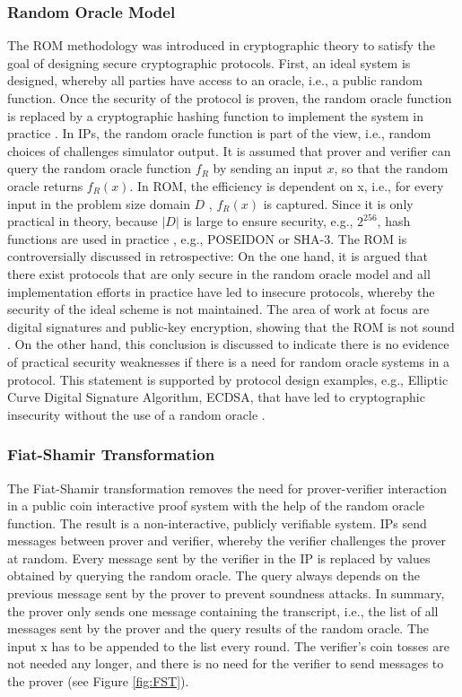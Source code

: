 \subsubsection{Random Oracle Model}
The ROM methodology was introduced in cryptographic theory to satisfy the goal of designing secure cryptographic protocols. First, an ideal system is designed, whereby all parties have access to an oracle, i.e., a public random function. Once the security of the protocol is proven, the random oracle function is replaced by a cryptographic hashing function to implement the system in practice \citep{ROMBellare}. In IPs, the random oracle function is part of the view, i.e., random choices of challenges simulator output. It is assumed that prover and verifier can query the random oracle function \(f_R\) by sending an input \(x\), so that the random oracle returns \(f_R(x)\). In ROM, the efficiency is dependent on x, i.e., for every input in the problem size domain \(D\) , \(f_R(x)\) is captured. Since it is only practical in theory, because \(|D|\) is large to ensure security, e.g., \(2^{256}\), hash functions are used in practice \citep{ROMBellare, Thaler}, e.g., POSEIDON or SHA-3. The ROM is controversially discussed in retrospective: On the one hand, it is argued that there exist protocols that are only secure in the random oracle model and all implementation efforts in practice have led to insecure protocols, whereby the security of the ideal scheme is not maintained. The area of work at focus are digital signatures and public-key encryption, showing that the ROM is not sound \citep{ROMCanetti}. On the other hand, this conclusion is discussed to indicate there is no evidence of practical security weaknesses if there is a need for random oracle systems in a protocol. This statement is supported by protocol design examples, e.g., Elliptic Curve Digital Signature Algorithm, ECDSA, that have led to cryptographic insecurity without the use of a random oracle \citep{ROMretroKoblitz}. 
\subsubsection{Fiat-Shamir Transformation}
The Fiat-Shamir transformation \citep{ROMFiat1986HowTP} removes the need for prover-verifier interaction in a public coin interactive proof system with the help of the random oracle function. The result is a non-interactive, publicly verifiable system. IPs send messages between prover and verifier, whereby the verifier challenges the prover at random. Every message sent by the verifier in the IP is replaced by values obtained by querying the random oracle. The query always depends on the previous message sent by the prover to prevent soundness attacks. In summary, the prover only sends one message containing the transcript, i.e., the list of all messages sent by the prover and the query results of the random oracle. The input x has to be appended to the list every round. The verifier's coin tosses are not needed any longer, and there is no need for the verifier to send messages to the prover (see Figure \ref{fig:FST}).

